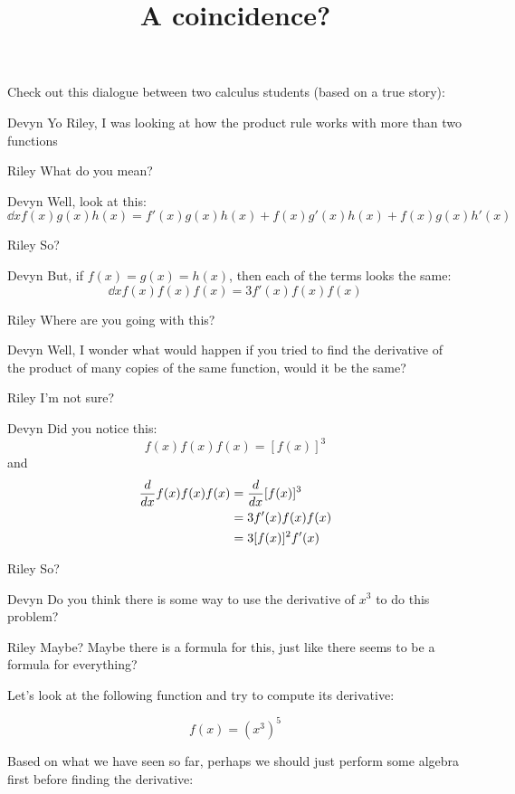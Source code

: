 \documentclass{ximera}
\title[Break-Ground:]{A coincidence?}
\begin{document}
\begin{abstract}

\end{abstract}
\maketitle


Check out this dialogue between two calculus students (based on a true
story):

\begin{dialogue}
\item[Devyn] Yo Riley, I was looking at how the product rule works with more than two functions
  \item[Riley] What do you mean?
\item[Devyn] Well, look at this:
\[  
	\dd{x} f(x)g(x) h(x)  = f'(x) g(x) h(x) + f(x)  g'(x)  h(x) + f(x)  g(x)  h'(x) 
\]
 \item[Riley] So?
\item[Devyn] But, if $f(x)=g(x)=h(x)$, then each of the terms looks the same:
\[  
	\dd{x} f(x) f(x)  f(x)  = 3 f'(x)  f(x)  f(x) 
 \]
 \item[Riley] Where are you going with this?
 \item[Devyn] Well, I wonder what would happen if you tried to find the derivative of the product of many copies of the same function, would it be the same?
 \item[Riley] I'm not sure?
 \item[Devyn] Did you notice this:
\[ 
	f(x) f(x) f(x) = [f(x)]^3
\]
 and
\begin{align*}
\frac{d}{\mathop{}\!d x} f(x) f(x) f(x) &= \frac{d}{\mathop{}\!d x} [f(x)]^3\\ 
&=  3 f'(x)  f(x)  f(x) \\
&= 3 [f(x)]^2 f'(x) 
\end{align*}
 \item[Riley] So?
 \item[Devyn] Do you think there is some way to use the derivative of $x^3$ to do this problem?
  \item[Riley] Maybe? Maybe there is a formula for this, just like there seems to be a formula for everything?

\end{dialogue}


Let's look at the following function and try to compute its derivative:

$$f(x)=(x^{3})^{5}$$

Based on what we have seen so far, perhaps we should just perform some algebra first before finding the derivative:
\end{document}
